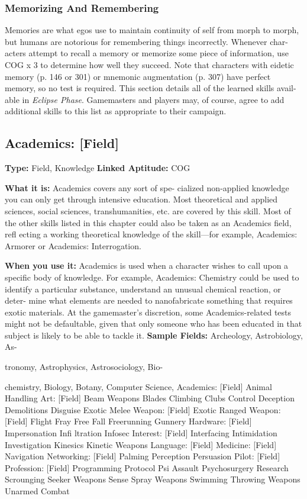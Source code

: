 \subsubsection{Memorizing And Remembering}

Memories are what egos use to maintain continuity of 
self from morph to morph, but humans are notorious 
for remembering things incorrectly. Whenever char-
acters attempt to recall a memory or memorize some 
piece of information, use COG x 3 to determine how 
well they succeed. Note that characters with eidetic 
memory (p. 146 or 301) or mnemonic augmentation 
(p. 307) have perfect memory, so no test is required.
This section details all of the learned skills avail-
able in \textit{Eclipse Phase}. Gamemasters and players 
may, of course, agree to add additional skills to 
this list as appropriate to their campaign.

\subsection{Academics: [Field]}

\textbf{Type:} Field, Knowledge
\textbf{Linked Aptitude:} COG

\textbf{What it is:} Academics covers any sort of spe-
cialized non-applied knowledge you can only get 
through intensive education. Most theoretical and 
applied sciences, social sciences, transhumanities, 
etc. are covered by this skill. Most of the other 
skills listed in this chapter could also be taken as 
an Academics field, refl ecting a working theoretical 
knowledge of the skill—for example, Academics: 
Armorer or Academics: Interrogation.

\textbf{When you use it:} Academics is used when a 
character wishes to call upon a specific body of 
knowledge. For example, Academics: Chemistry 
could be used to identify a particular substance, 
understand an unusual chemical reaction, or deter-
mine what elements are needed to nanofabricate 
something that requires exotic materials. At the 
gamemaster's discretion, some Academics-related 
tests might not be defaultable, given that only 
someone who has been educated in that subject is 
likely to be able to tackle it.
\textbf{Sample Fields:} Archeology, Astrobiology, As-

tronomy, Astrophysics, Astrosociology, Bio-

chemistry, Biology, Botany, Computer Science, 
Academics: [Field]
Animal Handling
Art: [Field]
Beam Weapons
Blades
Climbing
Clubs
Control
Deception
Demolitions
Disguise
Exotic Melee Weapon: [Field]
Exotic Ranged Weapon: [Field]
Flight
Fray
Free Fall
Freerunning
Gunnery
Hardware: [Field]
Impersonation
Inﬁ ltration
Infosec
Interest: [Field]
Interfacing
Intimidation
Investigation
Kinesics
Kinetic Weapons
Language: [Field]
Medicine: [Field]
Navigation
Networking: [Field]
Palming
Perception
Persuasion
Pilot: [Field]
Profession: [Field]
Programming
Protocol
Psi Assault
Psychosurgery
Research
Scrounging
Seeker Weapons
Sense
Spray Weapons
Swimming
Throwing Weapons
Unarmed Combat

